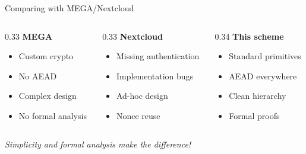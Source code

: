 \ifdefined\PRESENTATION\else\PassOptionsToClass{handout}{beamer}\fi\documentclass[aspectratio=169, lualatex]{beamer}
\begin{document}
\begin{frame}{Comparing with MEGA/Nextcloud}
	\begin{columns}[c]
		\begin{column}{0.33\textwidth}
			\textbf{MEGA}
			\begin{itemize}
				\item[\textcolor{red}{$\times$}] Custom crypto
				\item[\textcolor{red}{$\times$}] No AEAD
				\item[\textcolor{red}{$\times$}] Complex design
				\item[\textcolor{red}{$\times$}] No formal analysis
			\end{itemize}
		\end{column}
		\begin{column}{0.33\textwidth}
			\textbf{Nextcloud}
			\begin{itemize}
				\item[\textcolor{red}{$\times$}] Missing authentication
				\item[\textcolor{red}{$\times$}] Implementation bugs
				\item[\textcolor{red}{$\times$}] Ad-hoc design
				\item[\textcolor{red}{$\times$}] Nonce reuse
			\end{itemize}
		\end{column}
		\begin{column}{0.34\textwidth}
			\textbf{This scheme}
			\begin{itemize}
				\item[\textcolor{green}{\mycheckmark}] Standard primitives
				\item[\textcolor{green}{\mycheckmark}] AEAD everywhere
				\item[\textcolor{green}{\mycheckmark}] Clean hierarchy
				\item[\textcolor{green}{\mycheckmark}] Formal proofs
			\end{itemize}
		\end{column}
	\end{columns}
	\vspace{0.5cm}
	\begin{center}
		\textit{Simplicity and formal analysis make the difference!}
	\end{center}
\end{frame}
\end{document}
